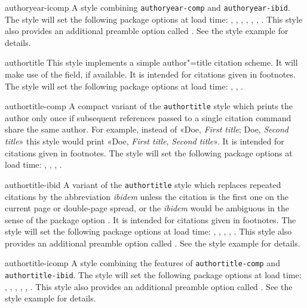 \documentclass{ltxdockit}[2011/03/25]
\begin{document}
\begin{marglist}
\item[authoryear-icomp]
A style combining \texttt{authoryear-comp} and \texttt{authoryear-ibid}. The style will set the following package options at load time: , , , , , , . This style also provides an additional preamble option called . See the style example for details.

\item[authortitle]
This style implements a simple author"=title citation scheme. It will make use of the  field, if available. It is intended for citations given in footnotes. The style will set the following package options at load time: , , .

\item[authortitle-comp]
A compact variant of the \texttt{authortitle} style which prints the author only once if subsequent references passed to a single citation command share the same author. For example, instead of «Doe, \emph{First title}; Doe, \emph{Second title}» this style would print «Doe, \emph{First title}, \emph{Second title}». It is intended for citations given in footnotes. The style will set the following package options at load time: , , , .

\item[authortitle-ibid]
A variant of the \texttt{authortitle} style which replaces repeated citations by the abbreviation \emph{ibidem} unless the citation is the first one on the current page or double-page spread, or the \emph{ibidem} would be ambiguous in the sense of the package option . It is intended for citations given in footnotes. The style will set the following package options at load time: , , , , . This style also provides an additional preamble option called . See the style example for details.

\item[authortitle-icomp]
A style combining the features of \texttt{authortitle-comp} and \texttt{authortitle-ibid}. The style will set the following package options at load time: , , , , , . This style also provides an additional preamble option called . See the style example for details.


\end{marglist}
\end{document}
